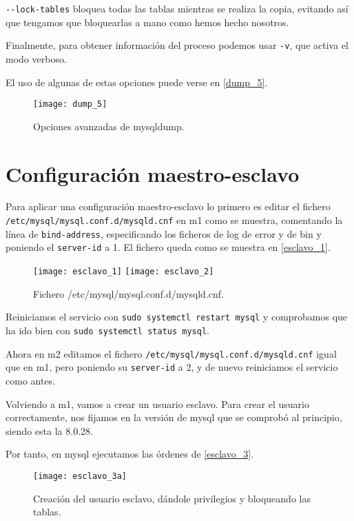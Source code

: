 \verb|--lock-tables| bloquea todas las tablas mientras se realiza la copia, evitando así que tengamos que bloquearlas a mano como hemos hecho nosotros.

Finalmente, para obtener información del proceso podemos usar \verb|-v|, que activa el modo verboso.

El uso de algunas de estas opciones puede verse en \eqref{dump_5}.

\begin{figure}[h!]
\begin{center}
\caption{Opciones avanzadas de mysqldump.}
\label{dump_5}
\texttt{[image: dump\_5]}
\end{center}
\end{figure}

\chapter{Configuración maestro-esclavo}

Para aplicar una configuración maestro-esclavo lo primero es editar el fichero \verb|/etc/mysql/mysql.conf.d/mysqld.cnf| en m1 como se muestra, comentando la línea de \verb|bind-address|, especificando los ficheros de log de error y de bin y poniendo el \verb|server-id| a 1. El fichero queda como se muestra en \eqref{esclavo_1}.

\begin{figure}[h!]
\begin{center}
\caption{Fichero /etc/mysql/mysql.conf.d/mysqld.cnf.}
\label{esclavo_1}
\texttt{[image: esclavo\_1]}
\texttt{[image: esclavo\_2]}
\end{center}
\end{figure}

Reiniciamos el servicio con \verb|sudo systemctl restart mysql| y comprobamos que ha ido bien con \verb|sudo systemctl status mysql|.

Ahora en m2 editamos el fichero \verb|/etc/mysql/mysql.conf.d/mysqld.cnf| igual que en m1, pero poniendo su \verb|server-id| a 2, y de nuevo reiniciamos el servicio como antes.

Volviendo a m1, vamos a crear un usuario esclavo. Para crear el usuario correctamente, nos fijamos en la versión de mysql que se comprobó al principio, siendo esta la 8.0.28.

Por tanto, en mysql ejecutamos las órdenes de \eqref{esclavo_3}.

\begin{figure}[h!]
\begin{center}
\caption{Creación del usuario esclavo, dándole privilegios y bloqueando las tablas.}
\label{esclavo_3}
\texttt{[image: esclavo\_3a]}
\end{center}
\end{figure}

